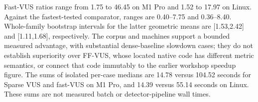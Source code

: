 Fast-VUS ratios range from 1.75 to 46.45 on M1 Pro and 1.52 to 17.97 on Linux.
Against the fastest-tested comparator, ranges are 0.40--7.75 and 0.36--8.40.
Whole-family bootstrap intervals for the latter geometric means are
[1.53,2.42] and [1.11,1.68], respectively. The corpus and machines support a
bounded measured advantage, with substantial dense-baseline slowdown cases;
they do not establish superiority over FF-VUS, whose located native code
has different metric semantics, or connect that code immutably to the
earlier workshop speedup figure.
The sums of isolated per-case medians are 14.78 versus 104.52 seconds for
Sparse VUS and fast-VUS on M1 Pro, and 14.39 versus 55.14 seconds on Linux.
These sums are not measured batch or detector-pipeline wall times.
